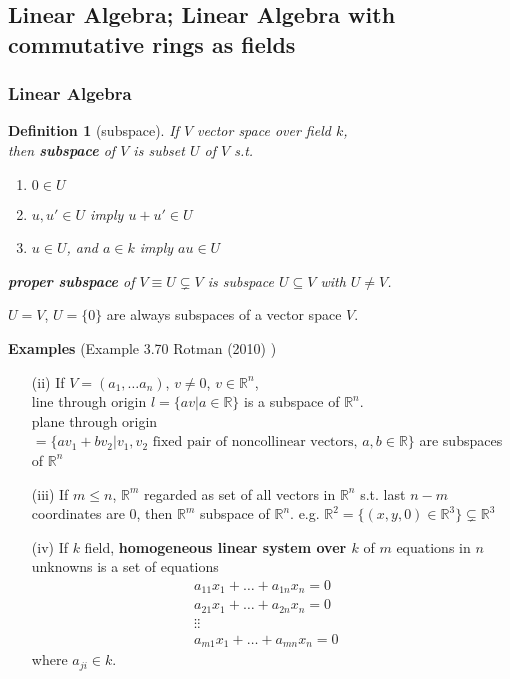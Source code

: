 \documentclass[10pt]{amsart}
\newtheorem{definition}{Definition}
\begin{document}
\begin{multicols*}{2}
\subsection{Linear Algebra; Linear Algebra with commutative rings as fields}

\subsubsection{Linear Algebra}

\begin{definition}[subspace]
	If $V$ vector space over field $k$, \\
	then \textbf{subspace} of $V$ is subset $U$ of $V$ s.t. 
	\begin{enumerate}
		\item $0\in U$
		\item $u,u' \in U$ imply $u+u' \in U$ 
		\item $u\in U$, and $a\in k$ imply $au \in U$
	\end{enumerate}
	\textbf{proper subspace} of $V \equiv U \subsetneq V$ is subspace $U \subseteq V$ with $U \neq V$.
\end{definition}
$U =V$, $U = \lbrace 0 \rbrace$ are always subspaces of a vector space $V$. 

\textbf{Examples} (Example 3.70 Rotman (2010) \cite{JRotman2010}) 
\begin{enumerate}
	\item[(ii)] If $V=(a_1, \dots a_n)$, $v\neq 0$, $v\in \mathbb{R}^n$, \\
	line through origin $l = \lbrace av | a \in \mathbb{R} \rbrace$ is a subspace of $\mathbb{R}^n$. \\
	plane through origin $=\lbrace av_1 + bv_2 | v_1 , v_2 \text{ fixed pair of noncollinear vectors, } a,b \in \mathbb{R} \rbrace$ are subspaces of $\mathbb{R}^n$
	\item[(iii)] If $m\leq n$, $\mathbb{R}^m$ regarded as set of all vectors in $\mathbb{R}^n$ s.t. last $n-m$ coordinates are $0$, then $\mathbb{R}^m$ subspace of $\mathbb{R}^n$.
	e.g. $\mathbb{R}^2 = \lbrace (x,y,0) \in \mathbb{R}^3 \rbrace \subsetneq \mathbb{R}^3$
	\item[(iv)] If $k$ field, \textbf{homogeneous linear system over $k$ } of $m$ equations in $n$ unknowns is a set of equations
	\[
	\begin{aligned}
	a_{11} x_1 + \dots + a_{1n} x_n = 0 & \\
	a_{21} x_1 + \dots + a_{2n} x_n = 0 & \\
	\vdots \vdots & \\
		a_{m1} x_1 + \dots + a_{mn} x_n = 0 & 
	\end{aligned}
	\] 
	where $a_{ji} \in k$.
	

\end{enumerate}
\end{multicols*}
\end{document}
